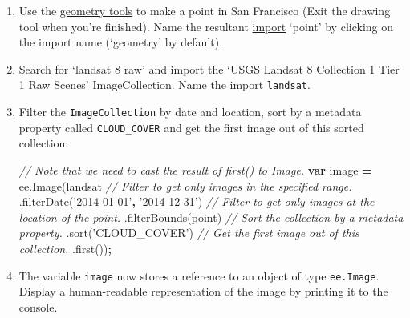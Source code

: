 \documentclass[
]{article}
\newenvironment{Shaded}{\begin{snugshade}}{\end{snugshade}}
\newcommand{\AttributeTok}[1]{\textcolor[rgb]{0.77,0.63,0.00}{#1}}
\newcommand{\CommentTok}[1]{\textcolor[rgb]{0.56,0.35,0.01}{\textit{#1}}}
\newcommand{\KeywordTok}[1]{\textcolor[rgb]{0.13,0.29,0.53}{\textbf{#1}}}
\newcommand{\NormalTok}[1]{#1}
\newcommand{\OperatorTok}[1]{\textcolor[rgb]{0.81,0.36,0.00}{\textbf{#1}}}
\newcommand{\StringTok}[1]{\textcolor[rgb]{0.31,0.60,0.02}{#1}}
\newcommand{\VariableTok}[1]{\textcolor[rgb]{0.00,0.00,0.00}{#1}}
\begin{document}
\begin{enumerate}
\def\labelenumi{\alph{enumi}.}
\setcounter{enumi}{1}
\item
  Use the \href{https://developers.google.com/earth-engine/playground\#geometry-tools}{geometry tools} to make a point in San Francisco (Exit the drawing tool when you're finished). Name the resultant \href{https://developers.google.com/earth-engine/playground\#imports}{import} `point' by clicking on the import name (`geometry' by default).
\item
  Search for `landsat 8 raw' and import the `USGS Landsat 8 Collection 1 Tier 1 Raw Scenes' ImageCollection. Name the import \texttt{landsat}.
\item
  Filter the \texttt{ImageCollection} by date and location, sort by a metadata property called \texttt{CLOUD\_COVER} and get the first image out of this sorted collection:

\begin{Shaded}
\begin{Highlighting}[]
\CommentTok{//  Note that we need to cast the result of first() to Image.   }
\KeywordTok{var}\NormalTok{ image }\OperatorTok{=} \VariableTok{ee}\NormalTok{.}\AttributeTok{Image}\NormalTok{(landsat        }
                     \CommentTok{//  Filter to get only images in the specified range.  }
\NormalTok{                     .}\AttributeTok{filterDate}\NormalTok{(}\StringTok{'2014-01-01'}\OperatorTok{,}  \StringTok{'2014-12-31'}\NormalTok{)        }
                     \CommentTok{//  Filter to get only images at the location of the point.     }
\NormalTok{                     .}\AttributeTok{filterBounds}\NormalTok{(point)        }
                     \CommentTok{//  Sort the collection by a metadata property.     }
\NormalTok{                     .}\AttributeTok{sort}\NormalTok{(}\StringTok{'CLOUD_COVER'}\NormalTok{)        }
                     \CommentTok{//  Get the first image out of this collection.     }
\NormalTok{                     .}\AttributeTok{first}\NormalTok{())}\OperatorTok{;}  
\end{Highlighting}
\end{Shaded}
\item
  The variable \texttt{image} now stores a reference to an object of type \texttt{ee.Image}. Display a human-readable representation of the image by printing it to the console.


\end{enumerate}
\end{document}

